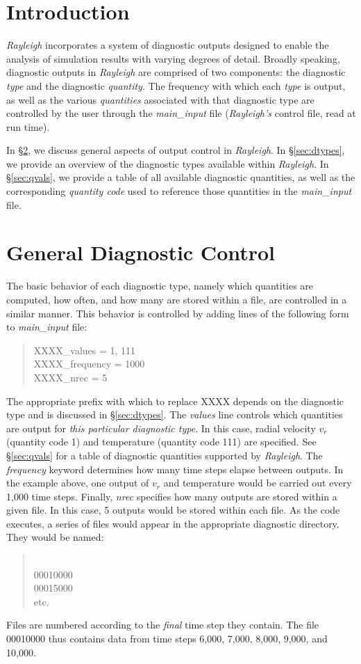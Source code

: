 \documentclass[12pt,letterpaper]{article}
\begin{document}
\section{Introduction}
\textit{Rayleigh} incorporates a system of diagnostic outputs designed to enable the analysis of simulation results with varying degrees of detail.  Broadly speaking, diagnostic outputs in \textit{Rayleigh} are comprised of two components:  the diagnostic \textit{type} and the diagnostic \textit{quantity}.  The frequency with which each \textit{type} is output, as well as the various \textit{quantities} associated with that diagnostic type are controlled by the user through the \textit{main\_input} file (\textit{Rayleigh's} control file, read at run time).

In \S\ref{sec:controls}, we discuss general aspects of output control in \textit{Rayleigh}. In \S\ref{sec:dtypes}, we provide an overview of the diagnostic types available within \textit{Rayleigh}.  In \S\ref{sec:qvals}, we provide a table of all available diagnostic quantities, as well as the corresponding \textit{quantity code} used to reference those quantities in the \textit{main\_input} file.

\section{General Diagnostic Control}\label{sec:controls}
The basic behavior of each diagnostic type, namely which quantities are computed, how often, and how many are stored within a file, are controlled in a similar manner.  This behavior is controlled by adding lines of the following form to \textit{main\_input} file:
\blockquote{\noindent XXXX\_values = 1, 111
\\
\noindent XXXX\_frequency = 1000
\\
\noindent XXXX\_nrec = 5
}
The appropriate prefix with which to replace XXXX depends on the diagnostic type and is discussed in \S\ref{sec:dtypes}. The \textit{values} line controls which quantities are output for \textit{this particular diagnostic type}.  In this case, radial velocity $v_r$ (quantity code 1) and temperature (quantity code 111) are specified.  See \S\ref{sec:qvals} for a table of diagnostic quantities supported by \textit{Rayleigh}.  The \textit{frequency} keyword determines how many time steps elapse between outputs.  In the example above, one output of $v_r$ and temperature would be carried out every 1,000 time steps.  Finally, \textit{nrec} specifies how many outputs are stored within a given file.  In this case, 5 outputs would be stored within each file.  As the code executes, a series of files would appear in the appropriate diagnostic directory.  They would be named:
\blockquote{
\\
00010000
\\
00015000
\\
etc.
}
Files are numbered according to the \textit{final} time step they contain.  The file 00010000 thus contains data from time steps 6,000, 7,000, 8,000, 9,000, and 10,000.  
\end{document}
